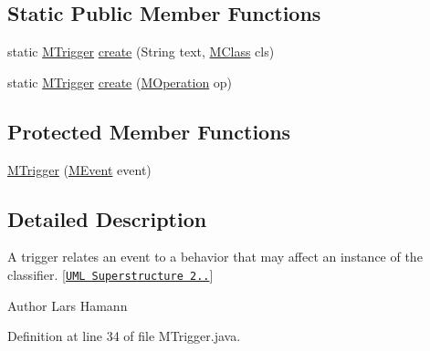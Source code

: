 \subsection*{Static Public Member Functions}
\begin{DoxyCompactItemize}
\item 
static \hyperlink{classorg_1_1tzi_1_1use_1_1uml_1_1mm_1_1commonbehavior_1_1communications_1_1_m_trigger}{M\-Trigger} \hyperlink{classorg_1_1tzi_1_1use_1_1uml_1_1mm_1_1commonbehavior_1_1communications_1_1_m_trigger_a39b86523e560a2e62532d5e8c0910417}{create} (String text, \hyperlink{interfaceorg_1_1tzi_1_1use_1_1uml_1_1mm_1_1_m_class}{M\-Class} cls)
\item 
static \hyperlink{classorg_1_1tzi_1_1use_1_1uml_1_1mm_1_1commonbehavior_1_1communications_1_1_m_trigger}{M\-Trigger} \hyperlink{classorg_1_1tzi_1_1use_1_1uml_1_1mm_1_1commonbehavior_1_1communications_1_1_m_trigger_ae0b65ecf7f839a020a1e3fc398018a34}{create} (\hyperlink{classorg_1_1tzi_1_1use_1_1uml_1_1mm_1_1_m_operation}{M\-Operation} op)
\end{DoxyCompactItemize}
\subsection*{Protected Member Functions}
\begin{DoxyCompactItemize}
\item 
\hyperlink{classorg_1_1tzi_1_1use_1_1uml_1_1mm_1_1commonbehavior_1_1communications_1_1_m_trigger_aa2277a69d8f547df80f3da47607e88bf}{M\-Trigger} (\hyperlink{classorg_1_1tzi_1_1use_1_1uml_1_1mm_1_1commonbehavior_1_1communications_1_1_m_event}{M\-Event} event)
\end{DoxyCompactItemize}


\subsection{Detailed Description}
A trigger relates an event to a behavior that may affect an instance of the classifier. \mbox{[}\href{http://www.omg.org/spec/UML/}{\tt U\-M\-L Superstructure 2..}\mbox{]} \begin{DoxyAuthor}{Author}
Lars Hamann 
\end{DoxyAuthor}


Definition at line 34 of file M\-Trigger.\-java.



